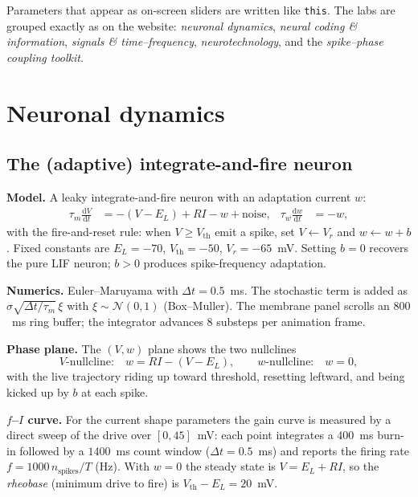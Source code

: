 \documentclass[11pt]{article}
\newcommand{\param}[1]{\textcolor{neonmag}{\texttt{#1}}}
\newcommand{\dd}{\mathrm{d}}
\begin{document}
Parameters that appear as on-screen sliders are written like \param{this}. The labs are
grouped exactly as on the website: \emph{neuronal dynamics}, \emph{neural coding \&
information}, \emph{signals \& time--frequency}, \emph{neurotechnology}, and the
\emph{spike--phase coupling toolkit}.

\section{Neuronal dynamics}

\subsection{The (adaptive) integrate-and-fire neuron}

\textbf{Model.} A leaky integrate-and-fire neuron with an adaptation current $w$:
\begin{align}
\tau_m \frac{\dd V}{\dd t} &= -(V - E_L) + R I - w + \text{noise}, &
\tau_w \frac{\dd w}{\dd t} &= -w,
\end{align}
with the fire-and-reset rule: when $V \ge V_{\text{th}}$ emit a spike, set $V \leftarrow V_r$
and $w \leftarrow w + b$. Fixed constants are $E_L=-70$, $V_{\text{th}}=-50$, $V_r=-65$~mV.
Setting $b=0$ recovers the pure LIF neuron; $b>0$ produces spike-frequency adaptation.

\textbf{Numerics.} Euler--Maruyama with $\Delta t = 0.5$~ms. The stochastic term is added as
$\sigma\sqrt{\Delta t/\tau_m}\,\xi$ with $\xi\sim\mathcal N(0,1)$ (Box--Muller). The membrane
panel scrolls an $800$~ms ring buffer; the integrator advances $8$ substeps per animation frame.

\textbf{Phase plane.} The $(V,w)$ plane shows the two nullclines
\[
\text{$V$-nullcline:}\quad w = R I - (V - E_L), \qquad
\text{$w$-nullcline:}\quad w = 0,
\]
with the live trajectory riding up toward threshold, resetting leftward, and being kicked up
by $b$ at each spike.

\textbf{$f$--$I$ curve.} For the current shape parameters the gain curve is measured by a
direct sweep of the drive over $[0,45]$~mV: each point integrates a $400$~ms burn-in followed
by a $1400$~ms count window ($\Delta t = 0.5$~ms) and reports the firing rate
$f = 1000\,n_{\text{spikes}}/T$ (Hz). With $w=0$ the steady state is $V=E_L+RI$, so the
\emph{rheobase} (minimum drive to fire) is $V_{\text{th}}-E_L = 20$~mV.
\end{document}
